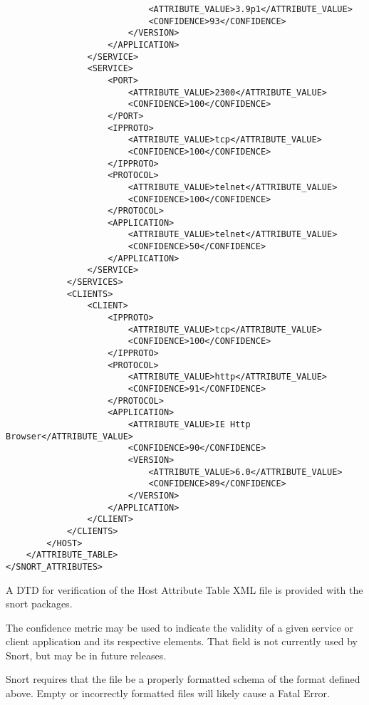 \documentclass[english]{report}
\newenvironment{note}{
\samepage
    \vspace{10pt}{\textsf{
        {\hspace{7pt}\Huge{$\triangle$\hspace{-12.5pt}{\Large{$^!$}}}}\hspace{5pt}
        {\Large{NOTE}}
    }
    }
   \begin{center}
    \par\vspace{-17pt}

    \begin{lrbox}{\savepar}
    \begin{minipage}[r]{6in}
}
{
    \end{minipage}
    \end{lrbox}
    \fbox{
        \usebox{
            \savepar
	}
    }
    \par\vskip10pt
    \end{center}
}
\newenvironment{note}{
        \begin{rawhtml}
        <p><table border="1"><tr><td><b>
        Note:&nbsp;&nbsp;</b>
        \end{rawhtml}
}{
        \begin{rawhtml}
        </b></td></tr></table></p>
        \end{rawhtml}
}
\begin{document}
\begin{verbatim}
                            <ATTRIBUTE_VALUE>3.9p1</ATTRIBUTE_VALUE>
                            <CONFIDENCE>93</CONFIDENCE>
                        </VERSION>
                    </APPLICATION>
                </SERVICE>
                <SERVICE>
                    <PORT>
                        <ATTRIBUTE_VALUE>2300</ATTRIBUTE_VALUE>
                        <CONFIDENCE>100</CONFIDENCE>
                    </PORT>
                    <IPPROTO>
                        <ATTRIBUTE_VALUE>tcp</ATTRIBUTE_VALUE>
                        <CONFIDENCE>100</CONFIDENCE>
                    </IPPROTO>
                    <PROTOCOL>
                        <ATTRIBUTE_VALUE>telnet</ATTRIBUTE_VALUE>
                        <CONFIDENCE>100</CONFIDENCE>
                    </PROTOCOL>
                    <APPLICATION>
                        <ATTRIBUTE_VALUE>telnet</ATTRIBUTE_VALUE>
                        <CONFIDENCE>50</CONFIDENCE>
                    </APPLICATION>
                </SERVICE>
            </SERVICES>
            <CLIENTS>
                <CLIENT>
                    <IPPROTO>
                        <ATTRIBUTE_VALUE>tcp</ATTRIBUTE_VALUE>
                        <CONFIDENCE>100</CONFIDENCE>
                    </IPPROTO>
                    <PROTOCOL>
                        <ATTRIBUTE_VALUE>http</ATTRIBUTE_VALUE>
                        <CONFIDENCE>91</CONFIDENCE>
                    </PROTOCOL>
                    <APPLICATION>
                        <ATTRIBUTE_VALUE>IE Http Browser</ATTRIBUTE_VALUE>
                        <CONFIDENCE>90</CONFIDENCE>
                        <VERSION>
                            <ATTRIBUTE_VALUE>6.0</ATTRIBUTE_VALUE>
                            <CONFIDENCE>89</CONFIDENCE>
                        </VERSION>
                    </APPLICATION>
                </CLIENT>
            </CLIENTS>
        </HOST>
    </ATTRIBUTE_TABLE>
</SNORT_ATTRIBUTES>
\end{verbatim}

A DTD for verification of the Host Attribute Table XML file is provided with
the snort packages.

The confidence metric may be used to indicate the validity of a given service
or client application and its respective elements.  That field is not
currently used by Snort, but may be in future releases.

\begin{note}

    Snort requires that the file be a properly formatted schema of the
    format defined above. Empty or incorrectly formatted files will likely
    cause a Fatal Error.

\end{note}
\end{document}
